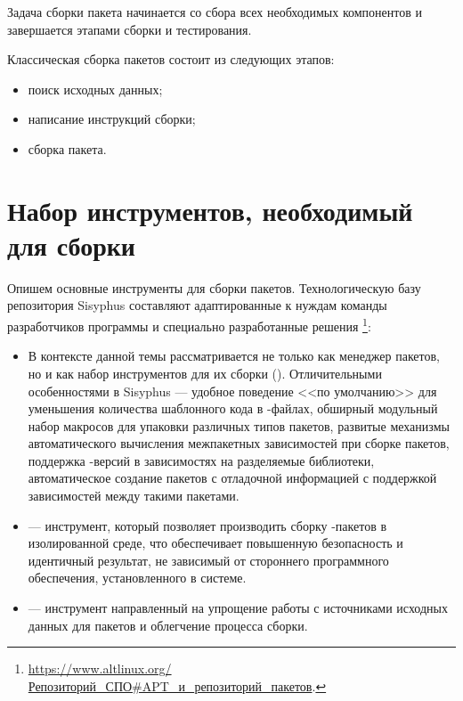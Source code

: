 
Задача сборки пакета начинается со сбора всех необходимых компонентов и завершается этапами сборки и тестирования.

Классическая сборка пакетов  состоит из следующих этапов:%

\begin{itemize}
	\item поиск исходных данных;
	\item написание инструкций сборки;
	\item сборка пакета.
\end{itemize}

\section{Набор инструментов, необходимый для сборки}

Опишем основные инструменты для сборки пакетов. Технологическую
базу репозитория Sisyphus составляют адаптированные к нуждам команды разработчиков
программы и специально разработанные решения%
\footnote{\href{https://www.altlinux.org/\%D0\%A0\%D0\%B5\%D0\%BF\%D0\%BE\%D0\%B7\%D0\%B8\%D1\%82\%D0\%BE\%D1\%80\%D0\%B8\%D0\%B9_\%D0\%A1\%D0\%9F\%D0\%9E\#APT_\%D0\%B8_\%D1\%80\%D0\%B5\%D0\%BF\%D0\%BE\%D0\%B7\%D0\%B8\%D1\%82\%D0\%BE\%D1\%80\%D0\%B8\%D0\%B9_\%D0\%BF\%D0\%B0\%D0\%BA\%D0\%B5\%D1\%82\%D0\%BE\%D0\%B2}{https://www.altlinux.org/Репозиторий\_СПО\#APT\_и\_репозиторий\_пакетов}.}:
\begin{itemize}
	\item {}  В контексте данной темы  рассматривается не только как менеджер пакетов,
		но и как набор инструментов для их сборки (). Отличительными особенностями 
		в Sisyphus --- удобное поведение <<по умолчанию>> для уменьшения количества шаблонного кода
		в -файлах, обширный модульный набор
		макросов для упаковки различных типов пакетов, развитые механизмы автоматического вычисления
		межпакетных зависимостей при сборке пакетов, поддержка -версий в зависимостях на
		разделяемые библиотеки, автоматическое создание пакетов с отладочной информацией с поддержкой
		зависимостей между такими пакетами.
	\item {} --- инструмент, который позволяет производить сборку -пакетов в изолированной среде,
		что обеспечивает повышенную безопасность и идентичный результат, не зависимый от стороннего
		программного обеспечения, установленного в системе.
	\item {} --- инструмент направленный на упрощение работы с источниками исходных данных для пакетов
		и облегчение процесса сборки.
\end{itemize}

